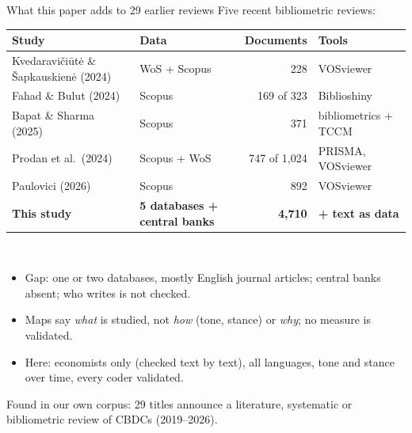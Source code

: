 \documentclass[aspectratio=169,10pt]{beamer}
\begin{document}
\begin{frame}{What this paper adds to 29 earlier reviews}
\footnotesize Five recent bibliometric reviews:\\[2pt]
\begin{tabular}{@{}llrl@{}}\toprule
\textbf{Study} & \textbf{Data} & \textbf{Documents} & \textbf{Tools}\\\midrule
Kvedaravi\v{c}i\={u}t\.{e} \& \v{S}apkauskien\.{e} (2024) & WoS + Scopus & 228 & VOSviewer\\
Fahad \& Bulut (2024) & Scopus & 169 of 323 & Biblioshiny\\
Bapat \& Sharma (2025) & Scopus & 371 & bibliometrics + TCCM\\
Prodan et al.\ (2024) & Scopus + WoS & 747 of 1{,}024 & PRISMA, VOSviewer\\
Paulovici (2026) & Scopus & 892 & VOSviewer\\\midrule
\textbf{This study} & \textbf{5 databases + central banks} & \textbf{4,710} & \textbf{+ text as data}\\
\bottomrule\end{tabular}\\[6pt]
\small
\begin{itemize}\setlength\itemsep{1pt}
\item \alert{Gap}: one or two databases, mostly English journal articles; central banks absent; who writes is not checked.
\item Maps say \emph{what} is studied, not \emph{how} (tone, stance) or \emph{why}; no measure is validated.
\item \alert{Here}: economists only (checked text by text), all languages, tone and stance over time, every coder validated.
\end{itemize}
\scriptsize Found in our own corpus: 29 titles announce a literature, systematic or bibliometric review of CBDCs (2019--2026).
\end{frame}
\end{document}

